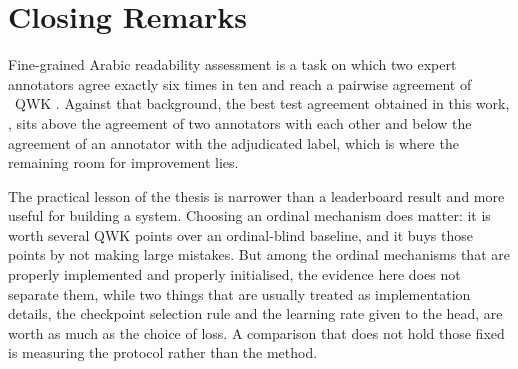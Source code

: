 \section{Closing Remarks}

Fine-grained Arabic readability assessment is a task on which two expert annotators agree
exactly six times in ten and reach a pairwise agreement of \iaaPairwiseQwk\ QWK
\cite{elmadani2025barec}. Against that background, the best test agreement obtained in this work,
\testQwkCoralHeadlr, sits above the agreement of two annotators with each other and below the
agreement of an annotator with the adjudicated label, which is where the remaining room for
improvement lies.

The practical lesson of the thesis is narrower than a leaderboard result and more useful for
building a system. Choosing an ordinal mechanism does matter: it is worth several QWK points
over an ordinal-blind baseline, and it buys those points by not making large mistakes. But
among the ordinal mechanisms that are properly implemented and properly initialised, the
evidence here does not separate them, while two things that are usually treated as
implementation details, the checkpoint selection rule and the learning rate given to the head,
are worth as much as the choice of loss. A comparison that does not hold those fixed is
measuring the protocol rather than the method.
